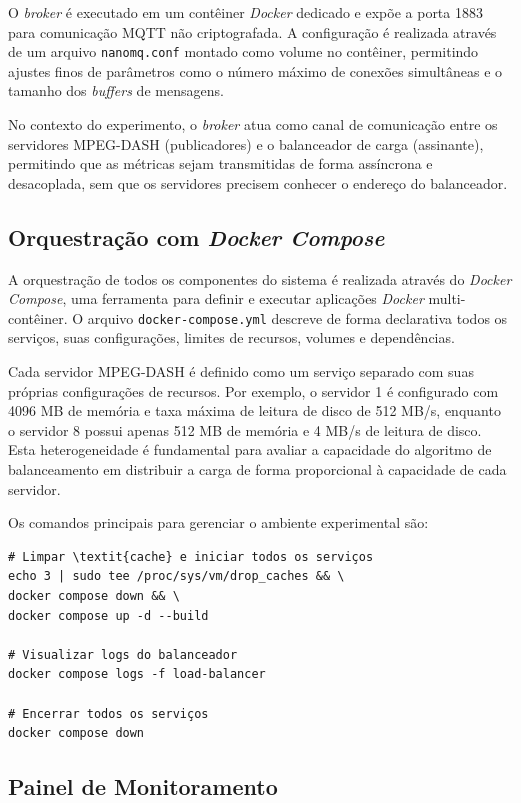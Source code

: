 O \textit{broker} é executado em um contêiner \textit{Docker} dedicado e expõe a porta 1883 para comunicação MQTT não criptografada. A configuração é realizada através de um arquivo \texttt{nanomq.conf} montado como volume no contêiner, permitindo ajustes finos de parâmetros como o número máximo de conexões simultâneas e o tamanho dos \textit{buffers} de mensagens.

No contexto do experimento, o \textit{broker} atua como canal de comunicação entre os servidores MPEG-DASH (publicadores) e o balanceador de carga (assinante), permitindo que as métricas sejam transmitidas de forma assíncrona e desacoplada, sem que os servidores precisem conhecer o endereço do balanceador.

\subsection{Orquestração com \textit{Docker Compose}}

A orquestração de todos os componentes do sistema é realizada através do \textit{Docker Compose}, uma ferramenta para definir e executar aplicações \textit{Docker} multi-contêiner. O arquivo \texttt{docker-compose.yml} descreve de forma declarativa todos os serviços, suas configurações, limites de recursos, volumes e dependências.

Cada servidor MPEG-DASH é definido como um serviço separado com suas próprias configurações de recursos. Por exemplo, o servidor 1 é configurado com 4096 MB de memória e taxa máxima de leitura de disco de 512 MB/s, enquanto o servidor 8 possui apenas 512 MB de memória e 4 MB/s de leitura de disco. Esta heterogeneidade é fundamental para avaliar a capacidade do algoritmo de balanceamento em distribuir a carga de forma proporcional à capacidade de cada servidor.

Os comandos principais para gerenciar o ambiente experimental são:

\begin{verbatim}
# Limpar \textit{cache} e iniciar todos os serviços
echo 3 | sudo tee /proc/sys/vm/drop_caches && \
docker compose down && \
docker compose up -d --build

# Visualizar logs do balanceador
docker compose logs -f load-balancer

# Encerrar todos os serviços
docker compose down
\end{verbatim}

\subsection{Painel de Monitoramento}

